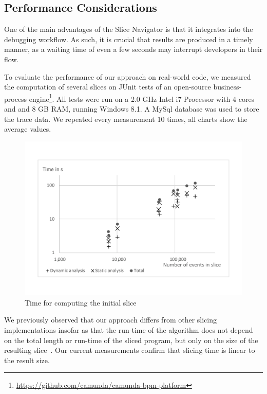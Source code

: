 \subsection{Performance Considerations}

One of the main advantages of the Slice Navigator is that it integrates into the debugging workflow.
As such, it is crucial that results are produced in a timely manner, as a waiting time of even a few seconds may interrupt developers in their flow.

To evaluate the performance of our approach on real-world code, we measured the computation of several slices on JUnit tests of an open-source business-process engine\footnote{\url{https://github.com/camunda/camunda-bpm-platform}}.
All tests were run on a 2.0 GHz Intel i7 Processor with 4 cores and and 8 GB RAM, running Windows 8.1.
A MySql database was used to store the trace data.
We repeated every measurement 10 times, all charts show the average values.

\begin{figure}
	\centering
		\includegraphics[width=\linewidth, clip, trim={20mm 26mm 20mm 26mm}]{img/chart-initial.pdf}
	\caption{Time for computing the initial slice}
	\label{fig:chartinitial}
\end{figure}

We previously observed that our approach differs from other slicing implementations insofar as that the run-time of the algorithm does not depend on the total length or run-time of the sliced program, but only on the size of the resulting slice~\cite{treffer_dynamic_2014}.
Our current measurements confirm that slicing time is linear to the result size.

